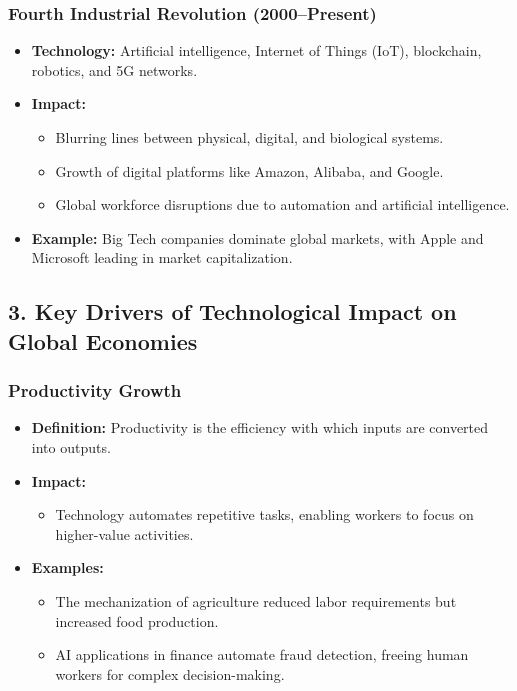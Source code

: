 \documentclass{article}
\begin{document}
\subsubsection*{Fourth Industrial Revolution (2000–Present)}
\begin{itemize}
    \item \textbf{Technology:} Artificial intelligence, Internet of Things (IoT), blockchain, robotics, and 5G networks.
    \item \textbf{Impact:}
    \begin{itemize}
        \item Blurring lines between physical, digital, and biological systems.
        \item Growth of digital platforms like Amazon, Alibaba, and Google.
        \item Global workforce disruptions due to automation and artificial intelligence.
    \end{itemize}
    \item \textbf{Example:} Big Tech companies dominate global markets, with Apple and Microsoft leading in market capitalization.
\end{itemize}

\subsection*{3. Key Drivers of Technological Impact on Global Economies}

\subsubsection*{ Productivity Growth}
\begin{itemize}
    \item \textbf{Definition:} Productivity is the efficiency with which inputs are converted into outputs.
    \item \textbf{Impact:}
    \begin{itemize}
        \item Technology automates repetitive tasks, enabling workers to focus on higher-value activities.
    \end{itemize}
    \item \textbf{Examples:}
    \begin{itemize}
        \item The mechanization of agriculture reduced labor requirements but increased food production.
        \item AI applications in finance automate fraud detection, freeing human workers for complex decision-making.
    \end{itemize}
\end{itemize}
\end{document}
